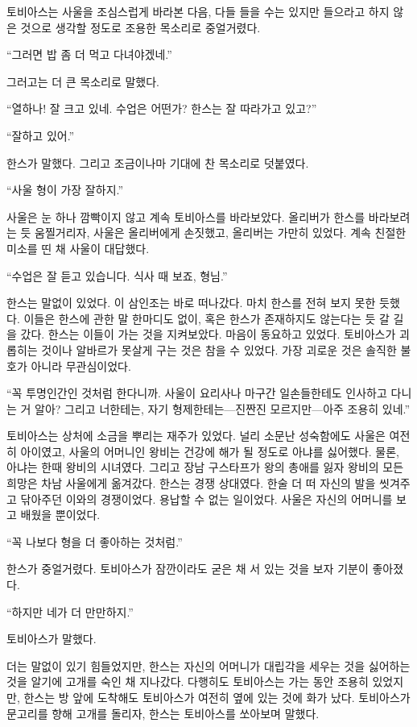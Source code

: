 토비아스는 사울을 조심스럽게 바라본 다음, 다들 들을 수는 있지만 들으라고 하지 않은 것으로 생각할 정도로 조용한 목소리로 중얼거렸다.

``그러면 밥 좀 더 먹고 다녀야겠네.''

그러고는 더 큰 목소리로 말했다.

``열하나! 잘 크고 있네. 수업은 어떤가? 한스는 잘 따라가고 있고?''

``잘하고 있어.''

한스가 말했다. 그리고 조금이나마 기대에 찬 목소리로 덧붙였다.

``사울 형이 가장 잘하지.''

사울은 눈 하나 깜빡이지 않고 계속 토비아스를 바라보았다. 올리버가 한스를 바라보려는 듯 움찔거리자, 사울은 올리버에게 손짓했고, 올리버는 가만히 있었다. 계속 친절한 미소를 띤 채 사울이 대답했다.

``수업은 잘 듣고 있습니다. 식사 때 보죠, 형님.''

한스는 말없이 있었다. 이 삼인조는 바로 떠나갔다. 마치 한스를 전혀 보지 못한 듯했다. 이들은 한스에 관한 말 한마디도 없이, 혹은 한스가 존재하지도 않는다는 듯 갈 길을 갔다. 한스는 이들이 가는 것을 지켜보았다. 마음이 동요하고 있었다. 토비아스가 괴롭히는 것이나 알바르가 못살게 구는 것은 참을 수 있었다. 가장 괴로운 것은 솔직한 불호가 아니라 무관심이었다.

``꼭 투명인간인 것처럼 한다니까. 사울이 요리사나 마구간 일손들한테도 인사하고 다니는 거 알아? 그리고 너한테는, 자기 형제한테는—진짠진 모르지만—아주 조용히 있네.''

토비아스는 상처에 소금을 뿌리는 재주가 있었다. 널리 소문난 성숙함에도 사울은 여전히 아이였고, 사울의 어머니인 왕비는 건강에 해가 될 정도로 아냐를 싫어했다. 물론, 아냐는 한때 왕비의 시녀였다. 그리고 장남 구스타프가 왕의 총애를 잃자 왕비의 모든 희망은 차남 사울에게 옮겨갔다. 한스는 경쟁 상대였다. 한술 더 떠 자신의 발을 씻겨주고 닦아주던 이와의 경쟁이었다. 용납할 수 없는 일이었다. 사울은 자신의 어머니를 보고 배웠을 뿐이었다.

``꼭 나보다 형을 더 좋아하는 것처럼.''

한스가 중얼거렸다. 토비아스가 잠깐이라도 굳은 채 서 있는 것을 보자 기분이 좋아졌다.

``하지만 네가 더 만만하지.''

토비아스가 말했다.

더는 말없이 있기 힘들었지만, 한스는 자신의 어머니가 대립각을 세우는 것을 싫어하는 것을 알기에 고개를 숙인 채 지나갔다. 다행히도 토비아스는 가는 동안 조용히 있었지만, 한스는 방 앞에 도착해도 토비아스가 여전히 옆에 있는 것에 화가 났다. 토비아스가 문고리를 향해 고개를 돌리자, 한스는 토비아스를 쏘아보며 말했다.

